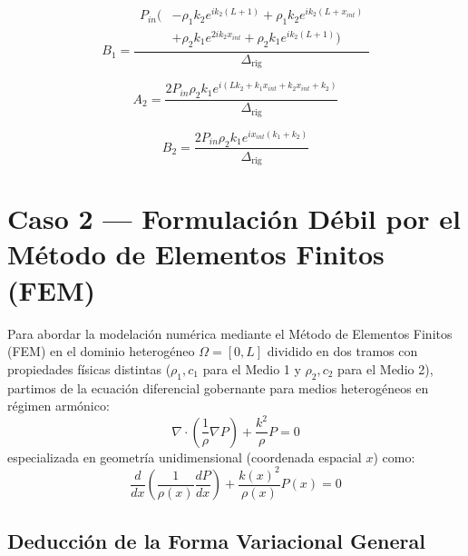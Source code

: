 \documentclass[11pt,letterpaper]{article}
\begin{document}
\begin{equation}
    B_1 = \frac{
        \begin{aligned}
            P_{in} \big( & - \rho_{1} k_{2} e^{i k_{2} \left(L + 1\right)} + \rho_{1} k_{2} e^{i k_{2} \left(L + x_{int}\right)} \\
            & + \rho_{2} k_{1} e^{2 i k_{2} x_{int}} + \rho_{2} k_{1} e^{i k_{2} \left(L + 1\right)} \big)
        \end{aligned}
    }{
        \Delta_{\text{rig}}
    }
\end{equation}

\begin{equation}
    A_2 = \frac{2 P_{in} \rho_{2} k_{1} e^{i \left(L k_{2} + k_{1} x_{int} + k_{2} x_{int} + k_{2}\right)}}{\Delta_{\text{rig}}}
\end{equation}

\begin{equation}
    B_2 = \frac{2 P_{in} \rho_{2} k_{1} e^{i x_{int} \left(k_{1} + k_{2}\right)}}{\Delta_{\text{rig}}}
\end{equation}
\section{Caso 2 --- Formulación Débil por el Método de Elementos Finitos (FEM)}


Para abordar la modelación numérica mediante el Método de Elementos Finitos (FEM) en el dominio heterogéneo $\Omega = [0, L]$ dividido en dos tramos con propiedades físicas distintas ($\rho_1, c_1$ para el Medio 1 y $\rho_2, c_2$ para el Medio 2), partimos de la ecuación diferencial gobernante para medios heterogéneos en régimen armónico:
\begin{equation}
    \nabla \cdot \left( \frac{1}{\rho} \nabla P \right) + \frac{k^2}{\rho} P = 0
\end{equation}
especializada en geometría unidimensional (coordenada espacial $x$) como:
\begin{equation}
    \frac{d}{dx} \left( \frac{1}{\rho(x)} \frac{dP}{dx} \right) + \frac{k(x)^2}{\rho(x)} P(x) = 0
\end{equation}

\subsection{Deducción de la Forma Variacional General}
\end{document}
